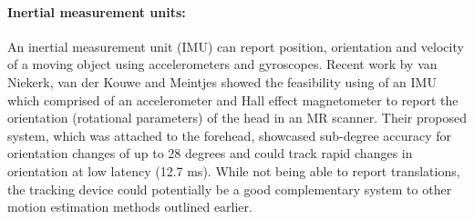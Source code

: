 \documentclass[class=article, crop=false]{standalone}
\begin{document}
\paragraph{Inertial measurement units:} An inertial measurement unit (IMU) can report position, orientation and velocity of a moving object using accelerometers and gyroscopes. Recent work by van Niekerk, van der Kouwe and Meintjes \parencite*{VanNiekerk2017} showed the feasibility using of an IMU which comprised of an accelerometer and Hall effect magnetometer to report the orientation (rotational parameters) of the head in an MR scanner. Their proposed system, which was attached to the forehead, showcased sub-degree accuracy for orientation changes of up to 28 degrees and could track rapid changes in orientation at low latency (12.7 ms). While not being able to report translations, the tracking device could potentially be a good complementary system to other motion estimation methods outlined earlier.
\end{document}
